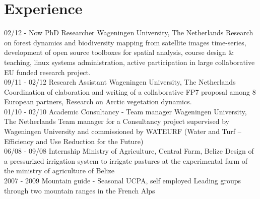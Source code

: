 \documentclass[]{friggeri-cv}
\begin{document}
\section{Experience}
\begin{entrylist}
  \entry
    {02/12 - Now}
    {PhD Researcher}
    {Wageningen University, The Netherlands}
    {Research on forest dynamics and biodiversity mapping from satellite images time-series, development of open source toolboxes for spatial analysis, course design \& teaching, linux systems administration, active participation in large collaborative EU funded research project.\\}
  \entry
    {09/11 - 02/12}
    {Research Assistant}
    {Wageningen University, The Netherlands}
    {Coordination of elaboration and writing of a collaborative FP7 proposal among 8 European partners, Research on Arctic vegetation dynamics.\\}
    \entry
    {01/10 - 02/10}
    {Academic Consultancy - Team manager}
    {Wageningen University, The Netherlands}
    {Team manager for a Consultancy project supervised by Wageningen University and commissioned by WATEURF (Water and Turf – Efficiency and Use Reduction for the Future)\\}
    \entry
    {06/08 - 09/08}
    {Internship}
    {Ministry of Agriculture, Central Farm, Belize}
    {Design of a pressurized irrigation system to irrigate pastures at the experimental farm of the ministry of agriculture of Belize\\}
    \entry
    {2007 - 2009}
    {Mountain guide - Seasonal}
    {UCPA, self employed}
    {Leading groups through two mountain ranges in the French Alps}
\end{entrylist}
\end{document}
